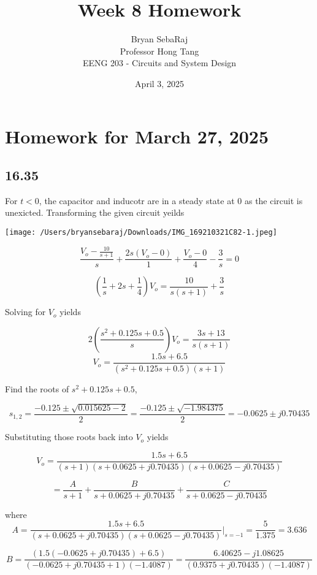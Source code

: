 \documentclass{article}
\title{Week 8 Homework}
\author{Bryan SebaRaj \\[0.7em] Professor Hong Tang \\[0.7em]  EENG 203 - Circuits and System Design}
\date{April 3, 2025}
\begin{document}
\maketitle

\section*{Homework for March 27, 2025}

\subsection*{16.35}


For $t<0$, the capacitor and inducotr are in a steady state at 0 as the circuit is unexicted. Transforming the given circuit yeilds

\begin{center}
    \texttt{[image: /Users/bryansebaraj/Downloads/IMG\_169210321C82-1.jpeg]}
\end{center}

\[
    \frac{V_o - \frac{10}{s+1}}{s} + \frac{2s(V_o - 0)}{1} + \frac{V_o - 0}{4} - \frac{3}{s} = 0
\]

\[
\left( \frac{1}{s} + 2s + \frac14 \right)V_o = \frac{10}{s(s+1)} + \frac{3}{s}
\]

Solving for $V_o$ yields

\[
2 \left( \frac{s^2 + 0.125s + 0.5}{s} \right)V_o = \frac{3s + 13}{s(s+1)}
\]
\[
V_o = \frac{1.5s + 6.5}{(s^2 + 0.125s + 0.5)(s+1)}
\]

Find the roots of $s^2 + 0.125s + 0.5$,

\[
s_{1,2} = \frac{-0.125 \pm \sqrt{0.015625 - 2}}{2} = \frac{-0.125 \pm \sqrt{-1.984375}}{2} = -0.0625 \pm j0.70435
\]

Substituting those roots back into $V_o$ yields

\[
V_o = \frac{1.5s + 6.5}{(s + 1)(s + 0.0625 + j0.70435)(s + 0.0625 - j0.70435)}
\]

\[
= \frac{A}{s + 1} + \frac{B}{s + 0.0625 + j0.70435} + \frac{C}{s + 0.0625 - j0.70435}
\]

where
\[
A = \frac{1.5s + 6.5}{(s + 0.0625 + j0.70435)(s + 0.0625 - j0.70435)}\Bigg|_{s = -1} = \frac{5}{1.375} = 3.636
\]

\[
B = \frac{(1.5(-0.0625 + j0.70435) + 6.5)}{(-0.0625 + j0.70435 + 1)(-1.4087)} = \frac{6.40625 - j1.08625}{(0.9375 + j0.70435)(-1.4087)}
\]
\end{document}
